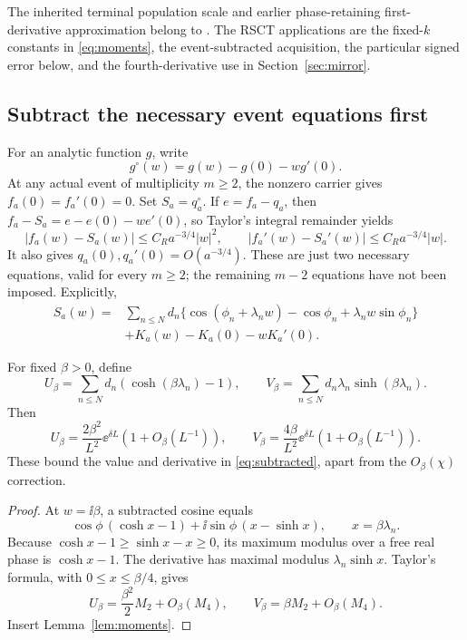 The inherited terminal population scale and earlier phase-retaining
first-derivative approximation belong to \cite{collision,s04}.
The RSCT applications are the fixed-\(k\) constants in
\eqref{eq:moments}, the event-subtracted acquisition, the particular
signed error below, and the fourth-derivative use in
Section~\ref{sec:mirror}.

\subsection{Subtract the necessary event equations first}

For an analytic function \(g\), write
\[
 g^\circ(w)=g(w)-g(0)-wg'(0).
\]
At any actual event of multiplicity \(m\ge2\), the nonzero carrier gives
\(f_a(0)=f_a'(0)=0\). Set \(S_a=q_a^\circ\). If \(e=f_a-q_a\),
then \(f_a-S_a=e-e(0)-we'(0)\), so Taylor's integral remainder yields
\begin{equation}\label{eq:eventerror}
 |f_a(w)-S_a(w)|\le C_Ra^{-3/4}|w|^2,\qquad
 |f_a'(w)-S_a'(w)|\le C_Ra^{-3/4}|w|.
\end{equation}
It also gives \(q_a(0),q_a'(0)=O(a^{-3/4})\).
These are just two necessary equations, valid for every \(m\ge2\);
the remaining \(m-2\) equations have not been imposed.
Explicitly,
\begin{equation}\label{eq:subtracted}
\begin{split}
 S_a(w)={}&\sum_{n\le N}d_n
 \{\cos(\phi_n+\lambda_nw)-\cos\phi_n
                       +\lambda_nw\sin\phi_n\}\\
 &+K_a(w)-K_a(0)-wK_a'(0).
\end{split}
\end{equation}

\begin{proposition}\label{prop:allowance}
For fixed \(\beta>0\), define
\[
 U_\beta=\sum_{n\le N}d_n(\cosh(\beta\lambda_n)-1),\qquad
 V_\beta=\sum_{n\le N}d_n\lambda_n\sinh(\beta\lambda_n).
\]
Then
\begin{equation}\label{eq:UV}
 U_\beta=\frac{2\beta^2}{L^2}\ee^{\delta L}(1+O_\beta(L^{-1})),
 \qquad
 V_\beta=\frac{4\beta}{L^2}\ee^{\delta L}(1+O_\beta(L^{-1})).
\end{equation}
These bound the value and derivative in \eqref{eq:subtracted},
apart from the \(O_\beta(\chi)\) correction.
\end{proposition}
\begin{proof}
At \(w=\ii\beta\), a subtracted cosine equals
\[
 \cos\phi\,(\cosh x-1)+\ii\sin\phi\,(x-\sinh x),
 \qquad x=\beta\lambda_n.
\]
Because \(\cosh x-1\ge\sinh x-x\ge0\), its maximum modulus over a free
real phase is \(\cosh x-1\). The derivative has maximal modulus
\(\lambda_n\sinh x\). Taylor's formula, with
\(0\le x\le\beta/4\), gives
\[
 U_\beta=\frac{\beta^2}{2}M_2+O_\beta(M_4),\qquad
 V_\beta=\beta M_2+O_\beta(M_4).
\]
Insert Lemma~\ref{lem:moments}.
\end{proof}

